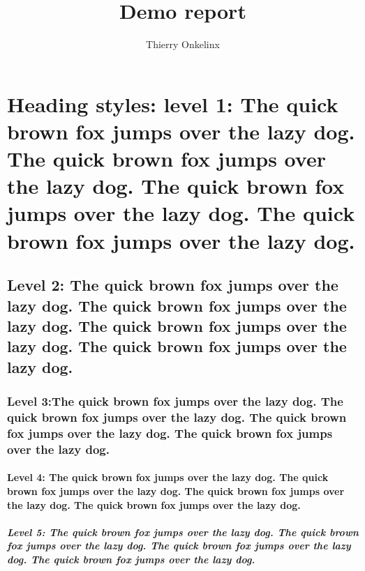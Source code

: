 \documentclass[9pt, twoside]{extreport}
\title{Demo report}
\author{Thierry Onkelinx}
\begin{document}
\maketitle
{}




\setcounter{tocdepth}{6}
\tableofcontents
{}
\listoffigures
{}
\listoftables
{}

\newpage
{}

\chapter{Heading styles: level 1: The quick brown fox jumps over the lazy dog. The quick brown fox jumps over the lazy dog. The quick brown fox jumps over the lazy dog. The quick brown fox jumps over the lazy dog.}

\lipsum[1-2]

\section{Level 2: The quick brown fox jumps over the lazy dog. The quick brown fox jumps over the lazy dog. The quick brown fox jumps over the lazy dog. The quick brown fox jumps over the lazy dog.}

\lipsum[3-4]

\subsection{Level 3:The quick brown fox jumps over the lazy dog. The quick brown fox jumps over the lazy dog. The quick brown fox jumps over the lazy dog. The quick brown fox jumps over the lazy dog.}

\lipsum[5-6]

\subsubsection{Level 4: The quick brown fox jumps over the lazy dog. The quick brown fox jumps over the lazy dog. The quick brown fox jumps over the lazy dog. The quick brown fox jumps over the lazy dog.}

\lipsum[7-8]

\paragraph{Level 5: The quick brown fox jumps over the lazy dog. The quick brown fox jumps over the lazy dog. The quick brown fox jumps over the lazy dog. The quick brown fox jumps over the lazy dog.}
\end{document}
